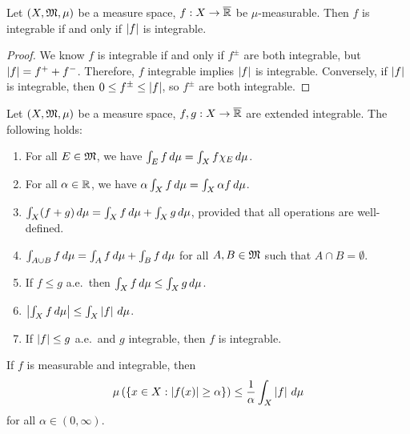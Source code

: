 \documentclass[a4paper]{article}
\begin{document}
\begin{prop}
  Let $(X, \mathfrak{M}, \mu)$ be a measure space, $f : X \to \overline{\mathbb{R}}$
  be $\mu$-measurable. Then $f$ is integrable
  if and only if $\left\lvert f\right\rvert$ is integrable.
\end{prop}

\begin{proof}
  We know $f$ is integrable if and only if $f^\pm$ are both integrable,
  but $\left\lvert f\right\rvert = f^+ + f^-$. Therefore, $f$ integrable implies $\left\lvert f\right\rvert$
  is integrable. Conversely, if $\left\lvert f\right\rvert$ is integrable, then $0 \leq
    f^\pm \leq \left\lvert f\right\rvert$, so $f^\pm$ are both integrable.
\end{proof}

\begin{thm}
  Let $(X, \mathfrak{M}, \mu)$ be a measure space, $f, g : X \to \overline{\mathbb{R}}$ are
  extended integrable. The following holds:
  \begin{enumerate}
    \item For all $E \in \mathfrak{M}$, we have $\int_E f \, d \mu = \int_X f \chi_E
          \, d \mu$.

    \item For all $\alpha \in \mathbb{R}$, we have $\alpha \int_X f \, d \mu =
          \int_X \alpha f \, d \mu$.

    \item $\int_X (f + g) \, d \mu = \int_X f \, d \mu +
            \int_X g \, d \mu$, provided that all operations are
          well-defined.

    \item $\int_{A \cup B} f \, d \mu = \int_A f \, d \mu
            + \int_B f \, d \mu$ for all $A, B \in \mathfrak{M}$ such that
          $A \cap B = \emptyset$.

    \item If $f \leq g$ a.e.\ then $\int_X f \, d \mu \leq \int_X g \, d \mu$.

    \item $\left\lvert \int_X f \, d \mu\right\rvert \leq \int_X \left\lvert f\right\rvert \, d \mu$.

    \item If $\left\lvert f\right\rvert \leq g$ a.e.\ and $g$ integrable, then $f$ is
          integrable.
  \end{enumerate}
\end{thm}

\begin{thm}
  If $f$ is measurable and integrable, then
  \[
    \mu \left( \left\{ x \in X : \left\lvert f(x)\right\rvert \geq \alpha \right\} \right)
    \leq \frac{1}{\alpha} \int_X \left\lvert f\right\rvert \, d \mu
  \]
  for all $\alpha \in (0, \infty)$.
\end{thm}
\end{document}
